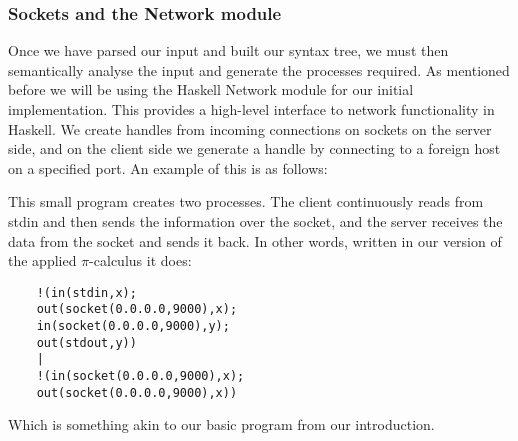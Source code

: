 \subsubsection{Sockets and the Network module}

Once we have parsed our input and built our syntax tree, we must then semantically analyse the input and generate the processes required. As mentioned before we will be using the Haskell Network module  for our initial implementation. This provides a high-level interface to network functionality in Haskell. We create handles from incoming connections on sockets on the server side, and on the client side we generate a handle by connecting to a foreign host on a specified port. An example
of this is as follows: 



This small program creates two processes. The client continuously reads from stdin and then sends the information over the socket, and the server receives the data from the socket and sends it back. In other words, written in our version of the applied $\pi$-calculus it does:
\begin{verbatim}
    !(in(stdin,x);
    out(socket(0.0.0.0,9000),x);
    in(socket(0.0.0.0,9000),y);
    out(stdout,y)) 
    |
    !(in(socket(0.0.0.0,9000),x);
    out(socket(0.0.0.0,9000),x))
\end{verbatim}

Which is something akin to our basic program from our introduction.

